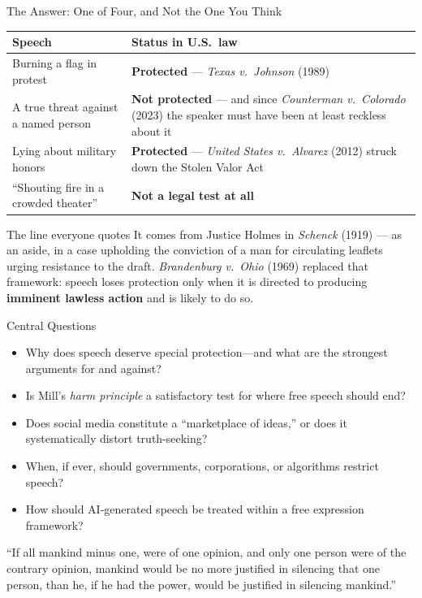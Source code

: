 ﻿\documentclass[aspectratio=169,11pt]{beamer}
\begin{document}
\begin{frame}{The Answer: One of Four, and Not the One You Think}
\begin{table}[h]
\centering
\small
\begin{tabular}{@{}p{5.6cm}p{6.4cm}@{}}
\toprule
\textbf{Speech} & \textbf{Status in U.S.\ law} \\
\midrule
Burning a flag in protest & \textbf{Protected} --- \emph{Texas v.\ Johnson} (1989) \\
A true threat against a named person & \textbf{Not protected} --- and since \emph{Counterman v.\ Colorado} (2023) the speaker must have been at least reckless about it \\
Lying about military honors & \textbf{Protected} --- \emph{United States v.\ Alvarez} (2012) struck down the Stolen Valor Act \\
``Shouting fire in a crowded theater'' & \textbf{Not a legal test at all} \\
\bottomrule
\end{tabular}
\end{table}

\begin{alertblock}{The line everyone quotes}
It comes from Justice Holmes in \emph{Schenck} (1919) --- as an aside, in a case upholding the conviction of a man for circulating leaflets urging resistance to the draft. \emph{Brandenburg v.\ Ohio} (1969) replaced that framework: speech loses protection only when it is directed to producing \textbf{imminent lawless action} and is likely to do so.
\end{alertblock}
\end{frame}

\begin{frame}{Central Questions}
\begin{itemize}
    \item Why does speech deserve special protection---and what are the strongest arguments for and against?
    \item Is Mill's \textit{harm principle} a satisfactory test for where free speech should end?
    \item Does social media constitute a ``marketplace of ideas,'' or does it systematically distort truth-seeking?
    \item When, if ever, should governments, corporations, or algorithms restrict speech?
    \item How should AI-generated speech be treated within a free expression framework?
\end{itemize}

\vspace{0.2cm}
\begin{quotebox}
``If all mankind minus one, were of one opinion, and only one person were of the contrary opinion, mankind would be no more justified in silencing that one person, than he, if he had the power, would be justified in silencing mankind.''
\end{quotebox}
\end{frame}
\end{document}
